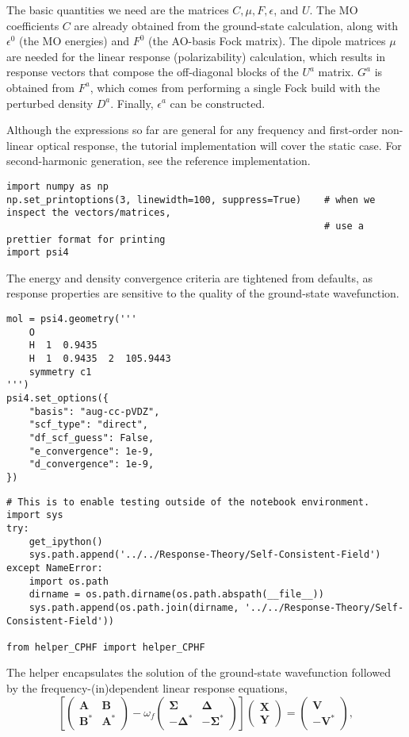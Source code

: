 The basic quantities we need are the matrices \(C, \mu, F, \epsilon\), and \(U\). The MO coefficients \(C\) are already obtained from the ground-state calculation, along with \(\epsilon^{0}\) (the MO energies) and \(F^{0}\) (the AO-basis Fock matrix). The dipole matrices \(\mu\) are needed for the linear response (polarizability) calculation, which results in response vectors that compose the off-diagonal blocks of the \(U^{a}\) matrix. \(G^{a}\) is obtained from \(F^{a}\), which comes from performing a single Fock build with the perturbed density \(D^{a}\).  Finally, \(\epsilon^{a}\) can be constructed.

Although the expressions so far are general for any frequency and first-order non-linear optical response, the tutorial implementation will cover the static case. For second-harmonic generation, see the reference implementation.
\begin{verbatim}
import numpy as np
np.set_printoptions(3, linewidth=100, suppress=True)    # when we inspect the vectors/matrices,
                                                        # use a prettier format for printing
import psi4
\end{verbatim}
The energy and density convergence criteria are tightened from defaults, as response properties are sensitive to the quality of the ground-state wavefunction.
\begin{verbatim}
mol = psi4.geometry('''
    O
    H  1  0.9435
    H  1  0.9435  2  105.9443
    symmetry c1
''')
psi4.set_options({
    "basis": "aug-cc-pVDZ",
    "scf_type": "direct",
    "df_scf_guess": False,
    "e_convergence": 1e-9,
    "d_convergence": 1e-9,
})
\end{verbatim}
\begin{verbatim}
# This is to enable testing outside of the notebook environment.
import sys
try:
    get_ipython()
    sys.path.append('../../Response-Theory/Self-Consistent-Field')
except NameError:
    import os.path
    dirname = os.path.dirname(os.path.abspath(__file__))
    sys.path.append(os.path.join(dirname, '../../Response-Theory/Self-Consistent-Field'))

from helper_CPHF import helper_CPHF
\end{verbatim}
The helper encapsulates the solution of the ground-state wavefunction followed by the frequency-(in)dependent linear response equations,
\[
  \left[
    \begin{pmatrix}
      \mathbf{A} & \mathbf{B} \\
      \mathbf{B}^{*} & \mathbf{A}^{*}
    \end{pmatrix}
    - \omega_{f}
    \begin{pmatrix}
      \mathbf{\Sigma} & \mathbf{\Delta} \\
      -\mathbf{\Delta}^{*} & -\mathbf{\Sigma}^{*}
    \end{pmatrix}
  \right]
  \begin{pmatrix}
    \mathbf{X} \\
    \mathbf{Y}
  \end{pmatrix}
  =
  \begin{pmatrix}
    \mathbf{V} \\
    -\mathbf{V}^{*}
  \end{pmatrix}
  ,
\]
